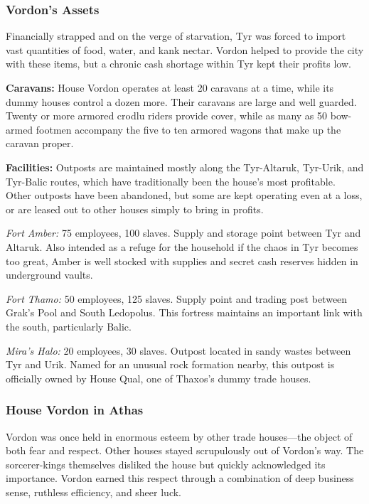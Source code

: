 \subsubsection{Vordon's Assets}
Financially strapped and on the verge of starvation, Tyr was forced to import vast quantities of food, water, and kank nectar. Vordon helped to provide the city with these items, but a chronic cash shortage within Tyr kept their profits low.

\textbf{Caravans:} House Vordon operates at least 20 caravans at a time, while its dummy houses control a dozen more. Their caravans are large and well guarded. Twenty or more armored crodlu riders provide cover, while as many as 50 bow-armed footmen accompany the five to ten armored wagons that make up the caravan proper.

\textbf{Facilities:} Outposts are maintained mostly along the Tyr-Altaruk, Tyr-Urik, and Tyr-Balic routes, which have traditionally been the house's most profitable. Other outposts have been abandoned, but some are kept operating even at a loss, or are leased out to other houses simply to bring in profits.

\textit{Fort Amber:} 75 employees, 100 slaves. Supply and storage point between Tyr and Altaruk. Also intended as a refuge for the household if the chaos in Tyr becomes too great, Amber is well stocked with supplies and secret cash reserves hidden in underground vaults.

\textit{Fort Thamo:} 50 employees, 125 slaves. Supply point and trading post between Grak's Pool and South Ledopolus. This fortress maintains an important link with the south, particularly Balic.

\textit{Mira's Halo:} 20 employees, 30 slaves. Outpost located in sandy wastes between Tyr and Urik. Named for an unusual rock formation nearby, this outpost is officially owned by House Qual, one of Thaxos's dummy trade houses.

\subsubsection{House Vordon in Athas}
Vordon was once held in enormous esteem by other trade houses---the object of both fear and respect. Other houses stayed scrupulously out of Vordon's way. The sorcerer-kings themselves disliked the house but quickly acknowledged its importance. Vordon earned this respect through a combination of deep business sense, ruthless efficiency, and sheer luck.

